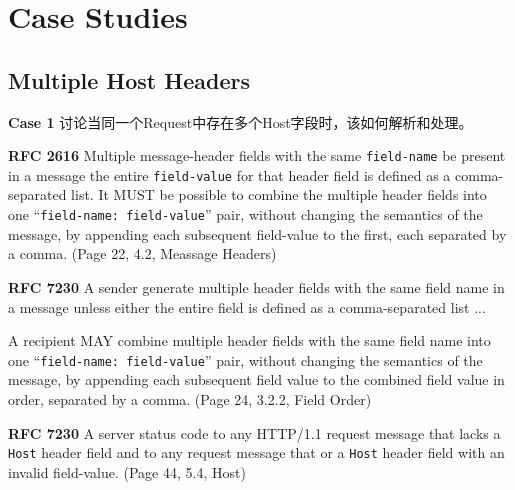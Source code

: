 \newpage
\section{Case Studies}
\subsection{Multiple Host Headers}

\textbf{Case 1} 讨论当同一个Request中存在多个Host字段时，该如何解析和处理。
\vspace{1ex}

\begin{spacing}{0.8}
	\begin{tcolorbox}
	
		\textbf{RFC 2616}
		Multiple message-header fields with the same \texttt{field-name} {\color{red}{MAY}} be present in a message {\color{red}{ if and only if (隐晦地说明Multiple Host是不允许的)}} the entire \texttt{field-value} for that header field is defined as a comma-separated list. It MUST be possible to combine the multiple header fields into one ``\texttt{field-name: field-value}'' pair, without changing the semantics of the message, by appending each subsequent field-value to the first, each separated by a comma. (Page 22, 4.2, Meassage Headers)
	\end{tcolorbox}
\end{spacing} 

\vspace{1ex}

\begin{spacing}{0.8}
		\begin{tcolorbox}
		\textbf{RFC 7230} 
		A sender {\color{red}{MUST NOT}} generate multiple header fields with the same field name in a message unless either the entire field is defined  as a comma-separated list ...
	
		A recipient MAY combine multiple header fields with the same field name into one ``\texttt{field-name: field-value}'' pair, without changing the semantics of the message, by appending each subsequent field value to the combined field value in order, separated by a comma. (Page 24, 3.2.2, Field Order)
	\end{tcolorbox}
\end{spacing}

\vspace{1ex}

\begin{spacing}{0.8}
	\begin{tcolorbox}
		\textbf{RFC 7230}
		A server {\color{red}{MUST respond with a 400 (Bad Request)}} status code to any HTTP/1.1 request message that lacks a \texttt{Host} header field and to any request message that {} or a \texttt{Host} header field with an invalid field-value. (Page 44, 5.4,  Host)
	\end{tcolorbox}
\end{spacing}

